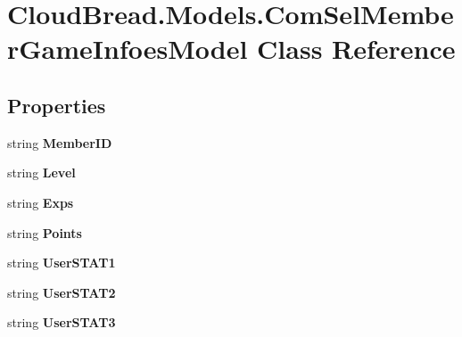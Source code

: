 \hypertarget{a00059}{}\section{Cloud\+Bread.\+Models.\+Com\+Sel\+Member\+Game\+Infoes\+Model Class Reference}
\label{a00059}
\subsection*{Properties}
\begin{DoxyCompactItemize}
\item 
string {\bfseries Member\+ID}\hypertarget{a00059_af2f18424328ad140e55742ad10ce71bb}{}\label{a00059_af2f18424328ad140e55742ad10ce71bb}

\item 
string {\bfseries Level}\hypertarget{a00059_ac18ac07bb77e290e7fd16d42e8357f37}{}\label{a00059_ac18ac07bb77e290e7fd16d42e8357f37}

\item 
string {\bfseries Exps}\hypertarget{a00059_ae8dda543f0ecd7abb48b729221e1c6f6}{}\label{a00059_ae8dda543f0ecd7abb48b729221e1c6f6}

\item 
string {\bfseries Points}\hypertarget{a00059_a68b7fa957f9a1e19b21f1e09fb5ea5a2}{}\label{a00059_a68b7fa957f9a1e19b21f1e09fb5ea5a2}

\item 
string {\bfseries User\+S\+T\+A\+T1}\hypertarget{a00059_af71c1fbb8ab4b55d7bf6c8e6c992e7a3}{}\label{a00059_af71c1fbb8ab4b55d7bf6c8e6c992e7a3}

\item 
string {\bfseries User\+S\+T\+A\+T2}\hypertarget{a00059_a1c33690ec65b9ea88bd3c8a1992f559d}{}\label{a00059_a1c33690ec65b9ea88bd3c8a1992f559d}

\item 
string {\bfseries User\+S\+T\+A\+T3}\hypertarget{a00059_af35420e9608fc20c856fe56f16940a5e}{}\label{a00059_af35420e9608fc20c856fe56f16940a5e}


\end{DoxyCompactItemize}
